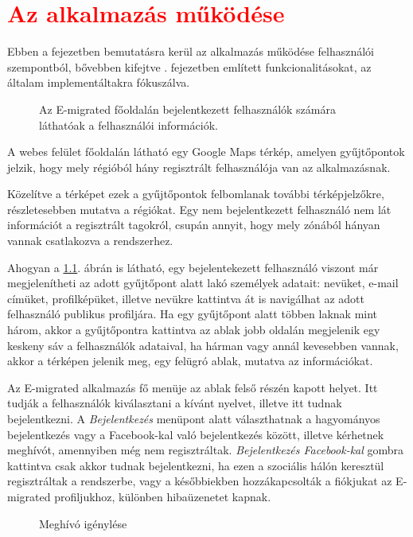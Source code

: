 \chapter{\textcolor{red}{Az alkalmazás működése}}
\label{ch:mukodes}
Ebben a fejezetben bemutatásra kerül az alkalmazás működése felhasználói szempontból, bővebben kifejtve . fejezetben említett funkcionalitásokat, az általam implementáltakra fókuszálva. 
\begin{figure}
  \centering
  \caption{Az E-migrated főoldalán bejelentkezett felhasználók számára láthatóak a felhasználói információk.}
  \label{fig:emigrated_terkep}
\end{figure}


A webes felület főoldalán látható egy Google Maps térkép, amelyen gyűjtőpontok jelzik, hogy mely régióból hány regisztrált felhasználója van az alkalmazásnak.

Közelítve a térképet ezek a gyűjtőpontok felbomlanak további térképjelzőkre, részletesebben mutatva a régiókat. Egy nem bejelentkezett felhasználó nem lát információt a regisztrált tagokról, csupán annyit, hogy mely zónából hányan vannak csatlakozva a rendszerhez. 


Ahogyan a \ref{fig:emigrated_terkep}. ábrán is látható, egy bejelentekezett felhasználó viszont már megjelenítheti az adott gyűjtőpont alatt lakó személyek adatait: nevüket, e-mail címüket, profilképüket, illetve nevükre kattintva át is navigálhat az adott felhasználó publikus profiljára. Ha egy gyűjtőpont alatt többen laknak mint három, akkor a gyűjtőpontra kattintva az ablak jobb oldalán megjelenik egy keskeny sáv a felhasználók adataival, ha hárman vagy annál kevesebben vannak, akkor a térképen jelenik meg, egy felügró ablak, mutatva az információkat. 


Az E-migrated alkalmazás fő menüje az ablak felső részén kapott helyet. Itt tudják a felhasználók kiválasztani a kívánt nyelvet, illetve itt tudnak bejelentkezni. A \textsl{Bejelentkezés} menüpont alatt választhatnak a hagyományos bejelentkezés vagy a Facebook-kal való bejelentkezés között, illetve kérhetnek meghívót, amennyiben még nem regisztráltak. \textsl{Bejelentkezés Facebook-kal} gombra kattintva csak akkor tudnak bejelentkezni, ha ezen a szociális hálón keresztül regisztráltak a rendszerbe, vagy a későbbiekben hozzákapcsolták a fiókjukat az E-migrated profiljukhoz, különben hibaüzenetet kapnak. 
\begin{figure}
  \centering
  \caption{Meghívó igénylése}
  \label{fig:emigrated_meghivo_igenyles}
\end{figure}

